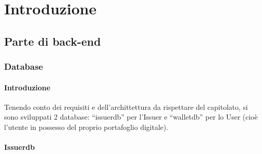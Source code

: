 \section{Introduzione}

\subsection{Parte di back-end}

\subsubsection{Database}\label{Database}

\paragraph{Introduzione}
Tenendo conto dei requisiti e dell’archittettura da rispettare del capitolato, si sono sviluppati 2 database: “issuerdb” per l’Issuer e “walletdb”  per lo User (cioè l’utente in possesso del proprio portafoglio digitale).

\paragraph{Issuerdb}
    
